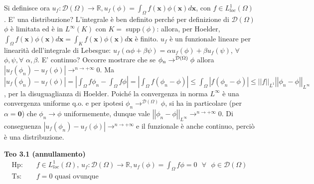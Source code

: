 \documentclass{article}
\begin{document}
Si definisce ora $u_{f}:\mathcal{D}\left( \Omega \right) \rightarrow 
\mathbb{R}
,u_{f}\left( \phi \right) =\int_{\Omega }f\left( \mathbf{x}\right) \phi
\left( \mathbf{x}\right) d\mathbf{x}$, con $f\in L_{loc}^{1}\left( \Omega
\right) $. E' una distribuzione? L'integrale \`{e} ben definito perch\'{e}
per definizione di $\mathcal{D}\left( \Omega \right) $ $\phi $ \`{e}
limitata ed \`{e} in $L^{\infty }\left( K\right) $ con $K=$ supp$\left( \phi
\right) $: allora, per Hoelder, $\int_{\Omega }f\left( \mathbf{x}\right)
\phi \left( \mathbf{x}\right) d\mathbf{x=}\int_{K}f\left( \mathbf{x}\right)
\phi \left( \mathbf{x}\right) d\mathbf{x}$ \`{e} finito. $u_{f}$ \`{e} un
funzionale lineare per linearit\`{a} dell'integrale di Lebesgue: $%
u_{f}\left( \alpha \phi +\beta \psi \right) =\alpha u_{f}\left( \phi \right)
+\beta u_{f}\left( \psi \right) $, $\forall $ $\phi ,\psi ,\forall $ $\alpha
,\beta $. E' continuo? Occorre mostrare che se $\phi _{n}\rightarrow ^{%
\mathcal{D}\left( \Omega \right) }\phi $ allora $\left\vert u_{f}\left( \phi
_{n}\right) -u_{f}\left( \phi \right) \right\vert \rightarrow ^{n\rightarrow
+\infty }0$. Ma $\left\vert u_{f}\left( \phi _{n}\right) -u_{f}\left( \phi
\right) \right\vert =\left\vert \int_{\Omega }f\phi _{n}-\int_{\Omega }f\phi
\right\vert =\left\vert \int_{\Omega }f\left( \phi _{n}-\phi \right)
\right\vert \leq \int_{\Omega }\left\vert f\left( \phi _{n}-\phi \right)
\right\vert \leq \left\vert \left\vert f\right\vert \right\vert
_{L^{1}}\left\vert \left\vert \phi _{n}-\phi \right\vert \right\vert
_{L^{\infty }}$, per la disuguaglianza di Hoelder. Poich\'{e} la convergenza
in norma $L^{\infty }$ \`{e} una convergenza uniforme q.o. e per ipotesi $%
\phi _{n}\rightarrow ^{\mathcal{D}\left( \Omega \right) }\phi $, si ha in
particolare (per $\alpha =\mathbf{0}$) che $\phi _{n}\rightarrow \phi $
uniformemente, dunque vale $\left\vert \left\vert \phi _{n}-\phi \right\vert
\right\vert _{L^{\infty }}\rightarrow ^{n\rightarrow +\infty }0$. Di
conseguenza $\left\vert u_{f}\left( \phi _{n}\right) -u_{f}\left( \phi
\right) \right\vert \rightarrow ^{n\rightarrow +\infty }$e il funzionale 
\`{e} anche continuo, perci\`{o} \`{e} una distribuzione.

\textbf{Teo 3.1 (annullamento)}%
\begin{eqnarray*}
\text{Hp}\text{: } &&f\in L_{loc}^{1}\left( \Omega \right) \text{, }u_{f}:%
\mathcal{D}\left( \Omega \right) \rightarrow 
\mathbb{R}
,u_{f}\left( \phi \right) =\int_{\Omega }f\phi =0\text{ }\forall \text{ }%
\phi \in \mathcal{D}\left( \Omega \right) \\
\text{Ts}\text{: } &&f=0\text{ quasi ovunque}
\end{eqnarray*}
\end{document}
